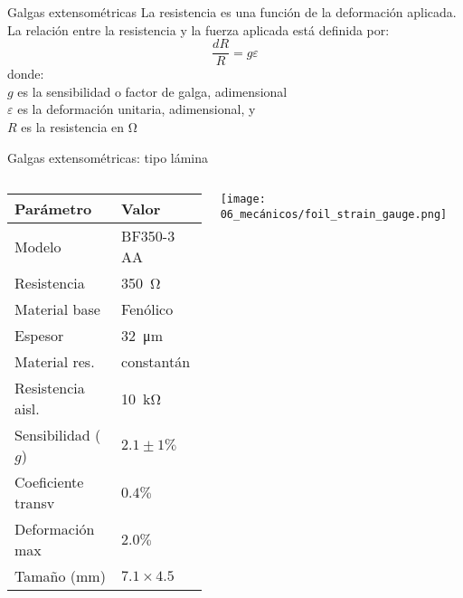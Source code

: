 \documentclass[aspectratio=169]{beamer}
\begin{document}
\begin{frame}[t]{Galgas extensométricas}
    La resistencia es una función de la deformación aplicada.
    La relación entre la resistencia y la fuerza aplicada está definida por:
    \begin{equation*}
        \dfrac{dR}{R} = g \varepsilon
    \end{equation*}
    donde:\\
    $g$ es la sensibilidad o factor de galga, adimensional\\
    $\varepsilon$ es la deformación unitaria, adimensional, y\\
    $R$ es la resistencia en $\si{\ohm}$
\end{frame}

\begin{frame}{Galgas extensométricas: tipo lámina}
    \begin{columns}[c, onlytextwidth]
        \begin{column}{0.55\textwidth}
            \begin{tabular}{ll}
            \toprule
            \textbf{Parámetro} & \textbf{Valor} \\
            \midrule
            Modelo & BF350-3 AA \\
            Resistencia & \SI{350}{\ohm} \\
            Material base & Fenólico \\
            Espesor & \SI{32}{\micro\meter} \\
            Material res. & constantán \\
            Resistencia aisl. & \SI{10}{\kilo\ohm}\\
            Sensibilidad ($g$) & $2.1 \pm 1\%$\\
            Coeficiente transv & $0.4\%$ \\
            Deformación max & $2.0\%$ \\
            Tamaño ($\si{\milli\meter}$) & $7.1 \times 4.5$ \\
            \bottomrule
            \end{tabular}
        \end{column}
        \begin{column}{0.45\textwidth}
        \centering
        \texttt{[image: 06\_mecánicos/foil\_strain\_gauge.png]}
        \end{column}
    \end{columns}
\end{frame}
\end{document}
